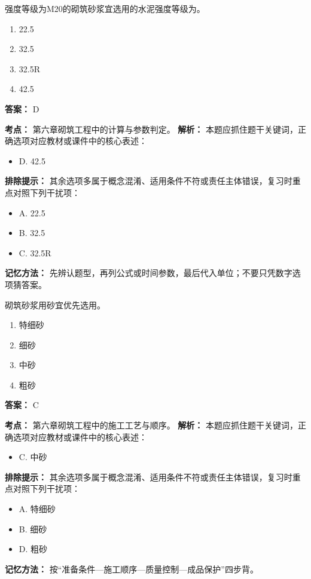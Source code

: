 \documentclass[UTF8,fontset=fandol,11pt]{ctexart}
\begin{document}
\begin{quizbox}[title={第 1 题}]
强度等级为M20的砌筑砂浆宜选用的水泥强度等级为。\\
\begin{enumerate}[label=\Alph*.]
\item 22.5
\item 32.5
\item 32.5R
\item 42.5
\end{enumerate}
\textbf{答案：} D
\vspace{0.25em}
\begin{answerbox}[title={考点解析}]
\textbf{考点：} 第六章砌筑工程中的计算与参数判定。
\textbf{解析：} 本题应抓住题干关键词，正确选项对应教材或课件中的核心表述：
\begin{itemize}
\item D. 42.5
\end{itemize}
\textbf{排除提示：} 其余选项多属于概念混淆、适用条件不符或责任主体错误，复习时重点对照下列干扰项：
\begin{itemize}
\item A. 22.5
\item B. 32.5
\item C. 32.5R
\end{itemize}
\textbf{记忆方法：} 先辨认题型，再列公式或时间参数，最后代入单位；不要只凭数字选项猜答案。
\end{answerbox}
\end{quizbox}

\begin{quizbox}[title={第 2 题}]
砌筑砂浆用砂宜优先选用。\\
\begin{enumerate}[label=\Alph*.]
\item 特细砂
\item 细砂
\item 中砂
\item 粗砂
\end{enumerate}
\textbf{答案：} C
\vspace{0.25em}
\begin{answerbox}[title={考点解析}]
\textbf{考点：} 第六章砌筑工程中的施工工艺与顺序。
\textbf{解析：} 本题应抓住题干关键词，正确选项对应教材或课件中的核心表述：
\begin{itemize}
\item C. 中砂
\end{itemize}
\textbf{排除提示：} 其余选项多属于概念混淆、适用条件不符或责任主体错误，复习时重点对照下列干扰项：
\begin{itemize}
\item A. 特细砂
\item B. 细砂
\item D. 粗砂
\end{itemize}
\textbf{记忆方法：} 按“准备条件—施工顺序—质量控制—成品保护”四步背。
\end{answerbox}
\end{quizbox}
\end{document}
